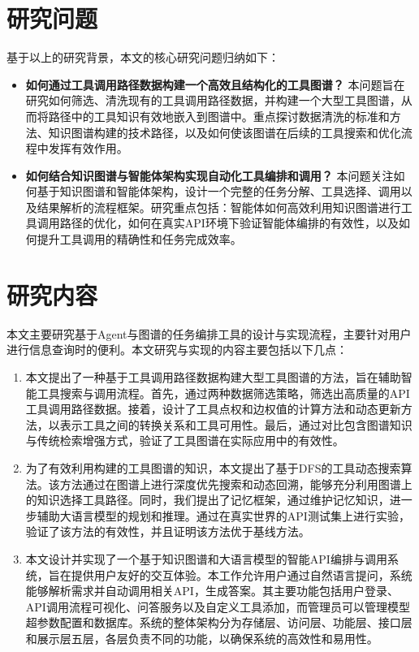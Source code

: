\section{研究问题}

基于以上的研究背景，本文的核心研究问题归纳如下：
\begin{itemize}
    \item \textbf{如何通过工具调用路径数据构建一个高效且结构化的工具图谱？}
   本问题旨在研究如何筛选、清洗现有的工具调用路径数据，并构建一个大型工具图谱，从而将路径中的工具知识有效地嵌入到图谱中。重点探讨数据清洗的标准和方法、知识图谱构建的技术路径，以及如何使该图谱在后续的工具搜索和优化流程中发挥有效作用。
    \item \textbf{如何结合知识图谱与智能体架构实现自动化工具编排和调用？}
   本问题关注如何基于知识图谱和智能体架构，设计一个完整的任务分解、工具选择、调用以及结果解析的流程框架。研究重点包括：智能体如何高效利用知识图谱进行工具调用路径的优化，如何在真实API环境下验证智能体编排的有效性，以及如何提升工具调用的精确性和任务完成效率。
\end{itemize}

\section{研究内容}
本文主要研究基于Agent与图谱的任务编排工具的设计与实现流程，主要针对用户进行信息查询时的便利。本文研究与实现的内容主要包括以下几点：

\begin{enumerate}
    \item 本文提出了一种基于工具调用路径数据构建大型工具图谱的方法，旨在辅助智能工具搜索与调用流程。首先，通过两种数据筛选策略，筛选出高质量的API工具调用路径数据。接着，设计了工具点权和边权值的计算方法和动态更新方法，以表示工具之间的转换关系和工具可用性。最后，通过对比包含图谱知识与传统检索增强方式，验证了工具图谱在实际应用中的有效性。
    \item 为了有效利用构建的工具图谱的知识，本文提出了基于DFS的工具动态搜索算法。该方法通过在图谱上进行深度优先搜索和动态回溯，能够充分利用图谱上的知识选择工具路径。同时，我们提出了记忆框架，通过维护记忆知识，进一步辅助大语言模型的规划和推理。通过在真实世界的API测试集上进行实验，验证了该方法的有效性，并且证明该方法优于基线方法。
    \item 本文设计并实现了一个基于知识图谱和大语言模型的智能API编排与调用系统，旨在提供用户友好的交互体验。本工作允许用户通过自然语言提问，系统能够解析需求并自动调用相关API，生成答案。其主要功能包括用户登录、API调用流程可视化、问答服务以及自定义工具添加，而管理员可以管理模型超参数配置和数据库。系统的整体架构分为存储层、访问层、功能层、接口层和展示层五层，各层负责不同的功能，以确保系统的高效性和易用性。
\end{enumerate}

